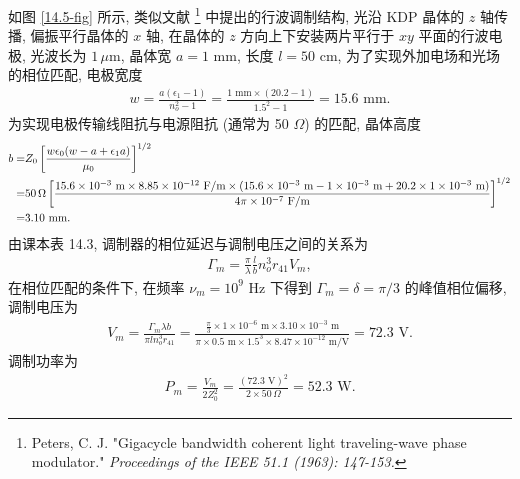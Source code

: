 \documentclass[twoside]{note}
\begin{document}
\begin{sol}
    如图 \ref{14.5-fig} 所示, 类似文献 \footnote{Peters, C. J. "Gigacycle bandwidth coherent light traveling-wave phase modulator." \itshape{Proceedings of the IEEE} 51.1 (1963): 147-153.} 中提出的行波调制结构, 光沿 KDP 晶体的 $z$ 轴传播, 偏振平行晶体的 $x$ 轴, 在晶体的 $z$ 方向上下安装两片平行于 $xy$ 平面的行波电极, 光波长为 $1\,\mu$m, 晶体宽 $a=1$ mm, 长度 $l=50$ cm, 为了实现外加电场和光场的相位匹配, 电极宽度
    \begin{align}
        w=\frac{a(\epsilon_1-1)}{n_o^2-1}=\frac{1\text{ mm}\times(20.2-1)}{1.5^2-1}=15.6\text{ mm}.
    \end{align}
    为实现电极传输线阻抗与电源阻抗 (通常为 50 $\Omega$) 的匹配, 晶体高度
    \begin{align}
        \notag b=&Z_0\left[\frac{w\epsilon_0(w-a+\epsilon_1a)}{\mu_0}\right]^{1/2}\\
        \notag=&50\,\Omega\left[\frac{15.6\times 10^{-3}\text{ m}\times8.85\times 10^{-12}\text{ F/m}\times(15.6\times 10^{-3}\text{ m}-1\times 10^{-3}\text{ m}+20.2\times 1\times 10^{-3}\text{ m})}{4\pi\times 10^{-7}\text{ F/m}}\right]^{1/2}\\
        =&3.10\text{ mm}.
    \end{align}
    由课本表 14.3, 调制器的相位延迟与调制电压之间的关系为
    \begin{align}
        \Gamma_m=\frac{\pi}{\lambda}\frac{l}{b}n_o^3r_{41}V_m,
    \end{align}
    在相位匹配的条件下, 在频率 $\nu_m=10^9$ Hz 下得到 $\Gamma_m=\delta=\pi/3$ 的峰值相位偏移, 调制电压为
    \begin{align}
        V_m=\frac{\Gamma_m\lambda b}{\pi ln_o^3r_{41}}=\frac{\frac{\pi}{3}\times 1\times 10^{-6}\text{ m}\times 3.10\times 10^{-3}\text{ m}}{\pi\times 0.5\text{ m}\times1.5^3\times 8.47\times 10^{-12}\text{ m/V}}=72.3\text{ V}.
    \end{align}
    调制功率为
    \begin{align}
        P_m=\frac{V_m}{2Z_0^2}=\frac{(72.3\text{ V})^2}{2\times 50\,\Omega}=52.3\text{ W}.
    \end{align}
    \begin{figure}[H]
        \centering

\end{figure}
\end{sol}
\end{document}
